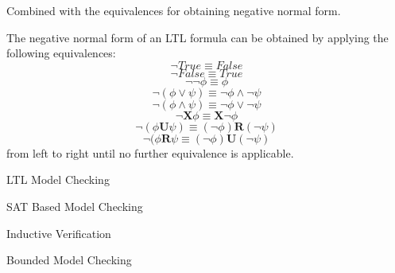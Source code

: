 Combined  with the equivalences for obtaining negative normal form.

\begin{mydef}
The negative normal form of an LTL formula can be obtained by applying the following equivalences:
$$\neg True \equiv False$$
$$\neg False \equiv True$$
$$\neg \neg \phi \equiv \phi$$
$$\neg (\phi \vee \psi) \equiv \neg \phi \wedge \neg \psi $$
$$\neg (\phi \wedge \psi) \equiv \neg \phi \vee \neg \psi$$
$$\neg \mathbf{X} \phi \equiv \mathbf{X} \neg \phi$$
$$\neg (\phi \mathbf{U} \psi) \equiv (\neg \phi) \mathbf{R} (\neg \psi)$$
$$\neg (\phi \mathbf{R} \psi \equiv (\neg \phi) \mathbf{U} (\neg \psi)$$
from left to right until no further equivalence is applicable.
\end{mydef}

LTL Model Checking

SAT Based Model Checking

Inductive Verification

Bounded Model Checking